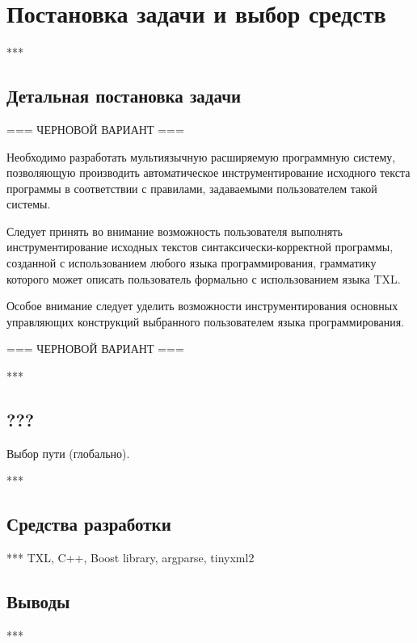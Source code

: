 \chapter{Постановка задачи и выбор средств}

***

\section{Детальная постановка задачи}

=== ЧЕРНОВОЙ ВАРИАНТ ===

Необходимо разработать мультиязычную расширяемую программную систему, позволяющую производить автоматическое инструментирование исходного текста программы в соответствии с правилами, задаваемыми пользователем такой системы.

Следует принять во внимание возможность пользователя выполнять инструментирование исходных текстов синтаксически-корректной программы, созданной с использованием любого языка программирования, грамматику которого может описать пользователь формально с использованием языка TXL.

Особое внимание следует уделить возможности инструментирования основных управляющих конструкций выбранного пользователем языка программирования.

=== ЧЕРНОВОЙ ВАРИАНТ ===

***

\section{???}

Выбор пути (глобально).

***

\section{Средства разработки}

***
TXL, C++, Boost library, argparse, tinyxml2

\section{Выводы}

***
